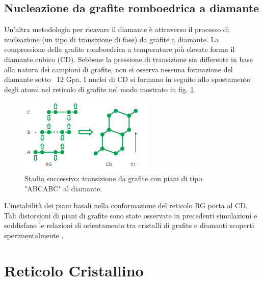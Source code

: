 \documentclass[a4paper,titlepage]{book}
\begin{document}
\subsection{Nucleazione da grafite romboedrica a diamante} \label{fif}
Un'altra metodologia per ricavare il diamante è attraverso il processo di nucleazione (un tipo di transizione di fase) da grafite a diamante. 
La compressione  della grafite romboedrica a temperature più elevate forma il diamante cubico (CD). Sebbene la pressione di transizione sia differente in base alla natura dei campioni di grafite, non si osserva nessuna formazione del diamante sotto ~12 Gpa. I nuclei di CD si formano in seguito allo spostamento degli atomi nel reticolo di grafite nel modo mostrato in fig. \ref{diamond}.\\
 \begin{figure}[h!] 
	\centering
	\includegraphics[width=0.6\columnwidth]{formdiamante.png}
	\caption{ 	\label{diamond}
		Stadio successivo: transizione da grafite con piani di tipo "ABCABC" al diamante.
	}
\end{figure}
L'instabilità dei piani basali nella conformazione del reticolo RG porta al CD. Tali distorsioni di piani di grafite sono state osservate in precedenti simulazioni e soddisfano le relazioni di orientamento tra cristalli di grafite e diamanti scoperti sperimentalmente \cite{Rustam}.
\section{Reticolo Cristallino}
\end{document}
